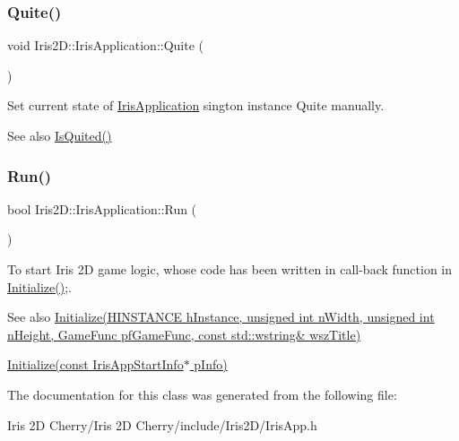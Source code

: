 \subsubsection{\texorpdfstring{Quite()}{Quite()}}
{\footnotesize\ttfamily void Iris2\+D\+::\+Iris\+Application\+::\+Quite (\begin{DoxyParamCaption}{ }\end{DoxyParamCaption})}



Set current state of \hyperlink{class_iris2_d_1_1_iris_application}{Iris\+Application} sington instance Quite manually. 

\begin{DoxySeeAlso}{See also}
\hyperlink{class_iris2_d_1_1_iris_application_ae9760ff496a4c80f96ad49331407c2e4}{Is\+Quited()} 
\end{DoxySeeAlso}
\mbox{\label{class_iris2_d_1_1_iris_application_ae6bb59365978c945201fd8cf82105e4f}} 
\subsubsection{\texorpdfstring{Run()}{Run()}}
{\footnotesize\ttfamily bool Iris2\+D\+::\+Iris\+Application\+::\+Run (\begin{DoxyParamCaption}{ }\end{DoxyParamCaption})}



To start Iris 2D game logic, whose code has been written in call-\/back function in \hyperlink{class_iris2_d_1_1_iris_application_a84f3ddebb3a3ffb0c172bd41fb952e1a}{Initialize()};. 

\begin{DoxySeeAlso}{See also}
\hyperlink{class_iris2_d_1_1_iris_application_a84f3ddebb3a3ffb0c172bd41fb952e1a}{Initialize(\+H\+I\+N\+S\+T\+A\+N\+C\+E h\+Instance, unsigned int n\+Width, unsigned int n\+Height, Game\+Func pf\+Game\+Func, const std\+::wstring\& wsz\+Title)} 

\hyperlink{class_iris2_d_1_1_iris_application_ac20656815694f980fccfc4369727a9a9}{Initialize(const Iris\+App\+Start\+Info$\ast$ p\+Info)} 
\end{DoxySeeAlso}


The documentation for this class was generated from the following file\+:\begin{DoxyCompactItemize}
\item 
Iris 2\+D Cherry/\+Iris 2\+D Cherry/include/\+Iris2\+D/Iris\+App.\+h\end{DoxyCompactItemize}
